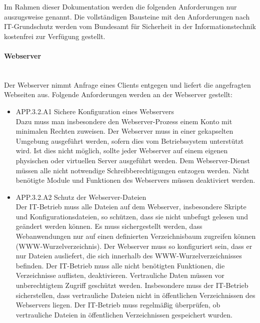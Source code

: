 Im Rahmen dieser Dokumentation werden die folgenden Anforderungen nur auszugsweise genannt. Die vollst\"andigen Bausteine mit den Anforderungen nach IT-Grundschutz werden vom Bundesamt f\"ur Sicherheit in der Informationstechnik kostenfrei zur Verf\"ugung gestellt.

\paragraph{Webserver}
\noindent \\Der Webserver nimmt Anfrage eines Clients entgegen und liefert die angefragten Webseiten aus. Folgende Anforderungen werden an der Webserver gestellt:
  \begin{itemize}
      \item APP.3.2.A1 Sichere Konfiguration eines Webservers\\
			Dazu muss man insbesondere den Webserver-Prozess einem Konto mit minimalen Rechten zuweisen. Der Webserver muss in einer gekapselten Umgebung ausgef\"uhrt werden, sofern dies vom Betriebssystem unterst\"utzt wird. Ist dies nicht m\"oglich, sollte jeder Webserver auf einem eigenen physischen oder virtuellen Server ausgef\"uhrt werden. Dem Webserver-Dienst m\"ussen alle nicht notwendige Schreibberechtigungen entzogen werden. Nicht ben\"otigte Module und Funktionen des Webservers m\"ussen deaktiviert werden.\cite{Grundschutz}\\
			
			\item APP.3.2.A2 Schutz der Webserver-Dateien\\
			Der IT-Betrieb muss alle Dateien auf dem Webserver, insbesondere Skripte und Konfigurationsdateien, so sch\"utzen, dass sie nicht unbefugt gelesen und ge\"andert werden k\"onnen. Es muss sichergestellt werden, dass Webanwendungen nur auf einen definierten Verzeichnisbaum zugreifen k\"onnen (WWW-Wurzelverzeichnis). Der Webserver muss so konfiguriert sein, dass er nur Dateien ausliefert, die sich innerhalb des WWW-Wurzelverzeichnisses befinden. Der IT-Betrieb muss alle nicht ben\"otigten Funktionen, die Verzeichnisse auflisten, deaktivieren. Vertrauliche Daten m\"ussen vor unberechtigtem Zugriff gesch\"utzt werden. Insbesondere muss der
IT-Betrieb sicherstellen, dass vertrauliche Dateien nicht in \"offentlichen Verzeichnissen des Webservers liegen. Der IT-Betrieb muss regelm\"a{\ss}ig \"uberpr\"ufen, ob vertrauliche Dateien in \"offentlichen Verzeichnissen gespeichert wurden.\cite{Grundschutz}\\


\end{itemize}
